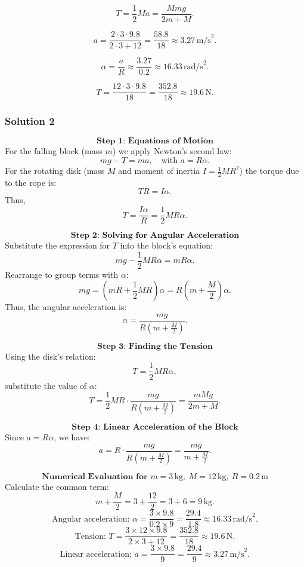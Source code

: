 \documentclass{article}
\begin{document}
\[T = \frac{1}{2} M a = \frac{M m g}{2m + M}.\]


\[a = \frac{2 \cdot 3 \cdot 9.8}{2 \cdot 3 + 12} 
  = \frac{58.8}{18} 
  \approx 3.27 \, \text{m/s}^2.\]

\[\alpha = \frac{a}{R} 
  \approx \frac{3.27}{0.2} 
  \approx 16.33 \, \text{rad/s}^2.\]

\[T = \frac{12 \cdot 3 \cdot 9.8}{18} 
  = \frac{352.8}{18} 
  \approx 19.6 \, \text{N}. \]


\subsubsection{Solution 2}
\[
\textbf{Step 1: Equations of Motion}
\]
For the falling block (mass \( m \)) we apply Newton’s second law:
\[
mg - T = ma, \quad \text{with } a = R\alpha.
\]
For the rotating disk (mass \( M \) and moment of inertia \( I = \tfrac{1}{2}MR^2 \)) the torque due to the rope is:
\[
TR = I\alpha.
\]
Thus,
\[
T = \frac{I\alpha}{R} = \frac{1}{2}MR\alpha.
\]

\[
\textbf{Step 2: Solving for Angular Acceleration}
\]
Substitute the expression for \( T \) into the block’s equation:
\[
mg - \frac{1}{2}MR\alpha = mR\alpha.
\]
Rearrange to group terms with \(\alpha\):
\[
mg = \left(mR + \frac{1}{2}MR\right)\alpha = R\left(m + \frac{M}{2}\right)\alpha.
\]
Thus, the angular acceleration is:
\[
\alpha = \frac{mg}{R\left(m + \frac{M}{2}\right)}.
\]

\[
\textbf{Step 3: Finding the Tension}
\]
Using the disk’s relation:
\[
T = \frac{1}{2}MR\alpha,
\]
substitute the value of \(\alpha\):
\[
T = \frac{1}{2}MR \cdot \frac{mg}{R\left(m + \frac{M}{2}\right)} = \frac{mMg}{2m+M}.
\]

\[
\textbf{Step 4: Linear Acceleration of the Block}
\]
Since \(a = R\alpha\), we have:
\[
a = R \cdot \frac{mg}{R\left(m + \frac{M}{2}\right)} = \frac{mg}{m + \frac{M}{2}}.
\]

\[
\textbf{Numerical Evaluation for } m=3\,\text{kg},\ M=12\,\text{kg},\ R=0.2\,\text{m}
\]
Calculate the common term:
\[
m + \frac{M}{2} = 3 + \frac{12}{2} = 3 + 6 = 9\,\text{kg}.
\]
\[
\text{Angular acceleration: } \alpha = \frac{3 \times 9.8}{0.2 \times 9} = \frac{29.4}{1.8} \approx 16.33\,\text{rad/s}^2.
\]
\[
\text{Tension: } T = \frac{3 \times 12 \times 9.8}{2 \times 3 + 12} = \frac{352.8}{18} \approx 19.6\,\text{N}.
\]
\[
\text{Linear acceleration: } a = \frac{3 \times 9.8}{9} = \frac{29.4}{9} \approx 3.27\,\text{m/s}^2.
\]
\end{document}
